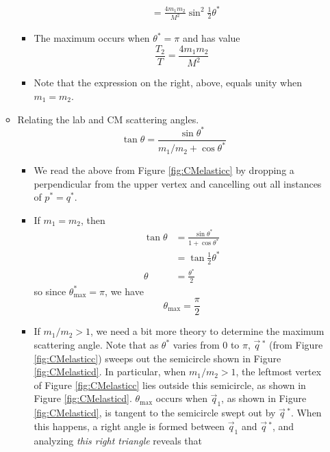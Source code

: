 \documentclass[../notes.tex]{subfiles}
\begin{document}
\begin{itemize}
\begin{itemize}
\begin{itemize}
\begin{align*}
                &= \frac{4m_1m_2}{M^2}\sin^2\frac{1}{2}\theta^*
            \end{align*}
            \item The maximum occurs when $\theta^*=\pi$ and has value
            \begin{equation*}
                \frac{T_2}{T} = \frac{4m_1m_2}{M^2}
            \end{equation*}
            \item Note that the expression on the right, above, equals unity when $m_1=m_2$.
        \end{itemize}
        \item Relating the lab and CM scattering angles.
        \begin{equation*}
            \tan\theta = \frac{\sin\theta^*}{m_1/m_2+\cos\theta^*}
        \end{equation*}
        \begin{itemize}
            \item We read the above from Figure \ref{fig:CMelasticc} by dropping a perpendicular from the upper vertex and cancelling out all instances of $p^*=q^*$.
            \item If $m_1=m_2$, then
            \begin{align*}
                \tan\theta &= \frac{\sin\theta^*}{1+\cos\theta^*}\\
                &= \tan\frac{1}{2}\theta^*\\
                \theta &= \frac{\theta^*}{2}
            \end{align*}
            so since $\theta^*_\text{max}=\pi$, we have
            \begin{equation*}
                \theta_\text{max} = \frac{\pi}{2}
            \end{equation*}
            \item If $m_1/m_2>1$, we need a bit more theory to determine the maximum scattering angle. Note that as $\theta^*$ varies from 0 to $\pi$, $\vec{q}{\,}^*$ (from Figure \ref{fig:CMelasticc}) sweeps out the semicircle shown in Figure \ref{fig:CMelasticd}. In particular, when $m_1/m_2>1$, the leftmost vertex of Figure \ref{fig:CMelasticc} lies outside this semicircle, as shown in Figure \ref{fig:CMelasticd}. $\theta_\text{max}$ occurs when $\vec{q}_1$, as shown in Figure \ref{fig:CMelasticd}, is tangent to the semicircle swept out by $\vec{q}{\,}^*$. When this happens, a right angle is formed between $\vec{q}_1$ and $\vec{q}{\,}^*$, and analyzing \emph{this right triangle} reveals that

\end{itemize}
\end{itemize}
\end{itemize}
\end{document}
